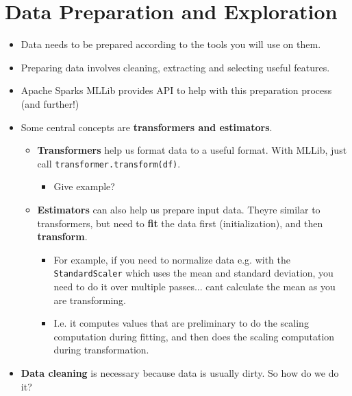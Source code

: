 
\section{Data Preparation and Exploration}
\begin{multicols}{2}
\begin{itemize}
\item
  Data needs to be prepared according to the tools you will use on them.
\item
  Preparing data involves cleaning, extracting and selecting useful
  features.
\item
  Apache Spark\textquotesingle s MLLib provides API to help with this
  preparation process (and further!)
\item
  Some central concepts are \textbf{transformers and estimators}.

  \begin{itemize}
    \item
    \textbf{Transformers} help us format data to a useful format. With
    MLLib, just call \texttt{transformer.transform(df)}.

    \begin{itemize}
        \item
      Give example?
    \end{itemize}
  \item
    \textbf{Estimators} can also help us prepare input data.
    They\textquotesingle re similar to transformers, but need to
    \textbf{fit} the data first (initialization), and then
    \textbf{transform}.

    \begin{itemize}
        \item
      For example, if you need to normalize data e.g. with the
      \texttt{StandardScaler} which uses the mean and standard
      deviation, you need to do it over multiple passes...
      can\textquotesingle t calculate the mean as you are transforming.
    \item
      I.e. it computes values that are preliminary to do the scaling
      computation during fitting, and then does the scaling computation
      during transformation.
    \end{itemize}
  \end{itemize}
\item
  \textbf{Data cleaning} is necessary because data is usually dirty. So
  how do we do it?


\end{itemize}
\end{multicols}
